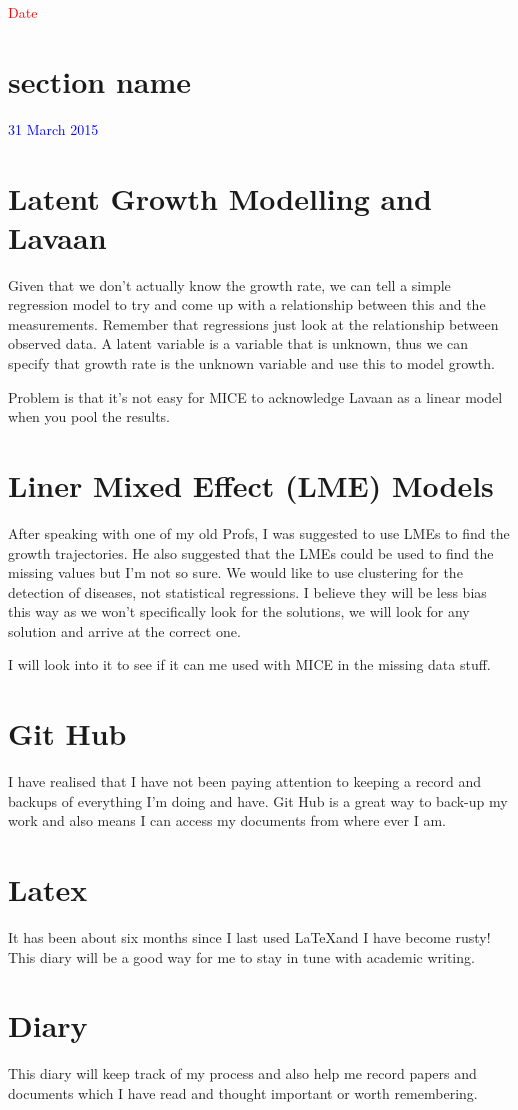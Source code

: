 \documentclass[12pt,letterpaper]{article}
\begin{document}
\univlogo



\textcolor{red}{\Huge Date}
\section*{section name} %
\label{sec:section_name}


\textcolor{blue}{\Huge 31 March 2015}
\section*{Latent Growth Modelling and Lavaan} %
\label{sec:latent_growth}
Given that we don't actually know the growth rate, we can tell a simple regression model to try and come up with a relationship between this and the measurements. Remember that regressions just look at the relationship between observed data. A latent variable is a variable that is unknown, thus we can specify that growth rate is the unknown variable and use this to model growth. 

Problem is that it's not easy for MICE to acknowledge Lavaan as a linear model when you pool the results.  
\section*{Liner Mixed Effect (LME) Models} %
\label{sec:liner_mixed_effec_}
After speaking with one of my old Profs, I was suggested to use LMEs to find the growth trajectories. He also suggested that the LMEs could be used to find the missing values but I'm not so sure. We would like to use clustering for the detection of diseases, not statistical regressions. I believe they will be less bias this way as we won't specifically look for the solutions, we will look for any solution and arrive at the correct one. 

I will look into it to see if it can me used with MICE in the missing data stuff. 
\section*{Git Hub} %
\label{sec:git_hub}
I have realised that I have not been paying attention to keeping a record and backups of everything I'm doing and have. Git Hub is a great way to back-up my work and also means I can access my documents from where ever I am. 
\section*{Latex} %
\label{sec:latex}
It has been about six months since I last used \LaTeX and I have become rusty! This diary will be a good way for me to stay in tune with academic writing. 
\section*{Diary} %
\label{sec:diary}
This diary will keep track of my process and also help me record papers and documents which I have read and thought important or worth remembering. 
\end{document}
